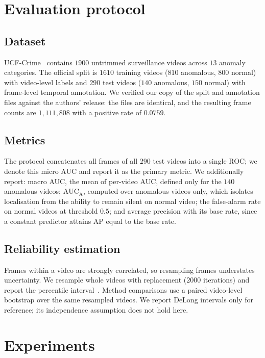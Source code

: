 \documentclass[11pt]{article}
\newcommand{\aucm}{\text{AUC}}
\begin{document}
\section{Evaluation protocol}
\label{sec:protocol}

\subsection{Dataset}
UCF-Crime~\citep{sultani2018real} contains $1900$ untrimmed surveillance videos
across $13$ anomaly categories. The official split is $1610$ training videos
($810$ anomalous, $800$ normal) with video-level labels and $290$ test videos
($140$ anomalous, $150$ normal) with frame-level temporal annotation. We verified
our copy of the split and annotation files against the authors' release: the
files are identical, and the resulting frame counts are $1{,}111{,}808$ with a
positive rate of $0.0759$.

\subsection{Metrics}
The protocol concatenates all frames of all $290$ test videos into a single ROC;
we denote this micro AUC and report it as the primary metric. We additionally
report: macro AUC, the mean of per-video AUC, defined only for the $140$
anomalous videos; $\aucm_{\mathrm{A}}$, computed over anomalous videos only,
which isolates localisation from the ability to remain silent on normal video;
the false-alarm rate on normal videos at threshold $0.5$; and average precision
with its base rate, since a constant predictor attains AP equal to the base rate.

\subsection{Reliability estimation}
Frames within a video are strongly correlated, so resampling frames understates
uncertainty. We resample whole videos with replacement ($2000$ iterations) and
report the percentile interval~\citep{efron1986bootstrap}. Method comparisons use a paired video-level
bootstrap over the same resampled videos. We report DeLong intervals only for
reference; its independence assumption does not hold here.

\section{Experiments}
\label{sec:experiments}
\end{document}

